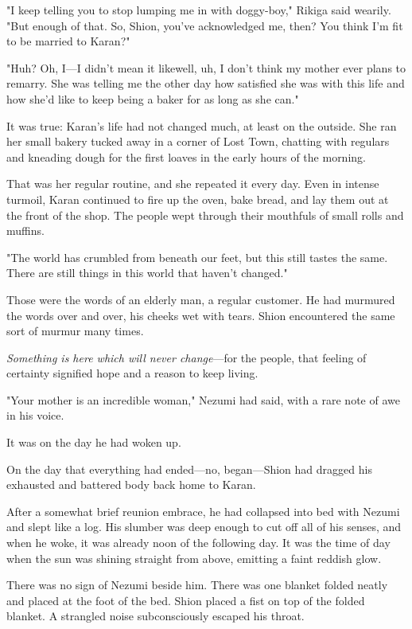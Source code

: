 "I keep telling you to stop lumping me in with doggy-boy," Rikiga said
wearily. "But enough of that. So, Shion, you've acknowledged me, then?
You think I'm fit to be married to Karan?"

"Huh? Oh, I---I didn't mean it like\el well, uh, I don't think my mother
ever plans to remarry. She was telling me the other day how satisfied
she was with this life and how she'd like to keep being a baker for as
long as she can."

It was true: Karan's life had not changed much, at least on the outside.
She ran her small bakery tucked away in a corner of Lost Town, chatting
with regulars and kneading dough for the first loaves in the early hours
of the morning.

That was her regular routine, and she repeated it every day. Even in
intense turmoil, Karan continued to fire up the oven, bake bread, and
lay them out at the front of the shop. The people wept through their
mouthfuls of small rolls and muffins.

"The world has crumbled from beneath our feet, but this still tastes the
same. There are still things in this world that haven't changed."

Those were the words of an elderly man, a regular customer. He had
murmured the words over and over, his cheeks wet with tears. Shion
encountered the same sort of murmur many times.

\emph{Something is here which will never change}---for the people, that feeling
of certainty signified hope and a reason to keep living.

"Your mother is an incredible woman," Nezumi had said, with a rare note
of awe in his voice.

It was on the day he had woken up.

On the day that everything had ended---no, began---Shion had dragged his
exhausted and battered body back home to Karan.

After a somewhat brief reunion embrace, he had collapsed into bed with
Nezumi and slept like a log. His slumber was deep enough to cut off all
of his senses, and when he woke, it was already noon of the following
day. It was the time of day when the sun was shining straight from
above, emitting a faint reddish glow.

There was no sign of Nezumi beside him. There was one blanket folded
neatly and placed at the foot of the bed. Shion placed a fist on top of
the folded blanket. A strangled noise subconsciously escaped his throat.

